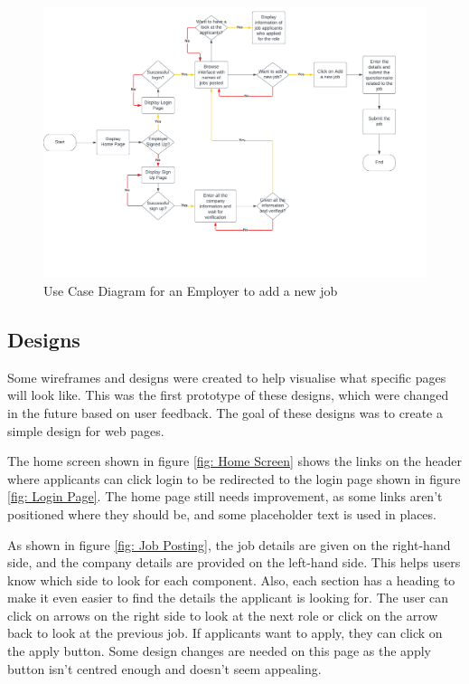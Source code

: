 \begin{figure}
    \noindent
    \centering
    \includegraphics[width = 140mm]{Figures/employer.pdf}
    \decoRule
    \caption[Use Case Diagram for an Employer to add a new job]{Use Case Diagram for an Employer to add a new job}
    \label{fig: Use Case Diagram for an Employer to add a new job}
\end{figure}

\newpage
\subsection{Designs}
Some wireframes and designs were created to help visualise what specific pages will look like. This was the first prototype of these designs, which were changed in the future based on user feedback. The goal of these designs was to create a simple design for web pages.

The home screen shown in figure \ref{fig: Home Screen} shows the links on the header where applicants can click login to be redirected to the login page shown in figure \ref{fig: Login Page}. The home page still needs improvement, as some links aren't positioned where they should be, and some placeholder text is used in places. 

As shown in figure \ref{fig: Job Posting}, the job details are given on the right-hand side, and the company details are provided on the left-hand side. This helps users know which side to look for each component. Also, each section has a heading to make it even easier to find the details the applicant is looking for. The user can click on arrows on the right side to look at the next role or click on the arrow back to look at the previous job. If applicants want to apply, they can click on the apply button. Some design changes are needed on this page as the apply button isn't centred enough and doesn't seem appealing.

